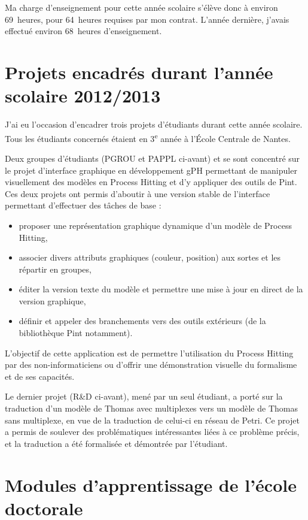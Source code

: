 Ma charge d'enseignement pour cette année scolaire s'élève donc à environ 69~heures, pour 64~heures requises par mon contrat.
L'année dernière, j'avais effectué environ 68~heures d'enseignement.



\section{Projets encadrés durant l'année scolaire 2012/2013}

J'ai eu l'occasion d'encadrer trois projets d'étudiants durant cette année scolaire. Tous les étudiants concernés étaient en 3\textsuperscript{e} année à l'École Centrale de Nantes.

Deux groupes d'étudiants (PGROU et PAPPL ci-avant) et se sont concentré sur le projet d'interface graphique en développement gPH permettant de manipuler visuellement des modèles en Process Hitting et d'y appliquer des outils de Pint.
Ces deux projets ont permis d'aboutir à une version stable de l'interface permettant d'effectuer des tâches de base :
\begin{itemize}
  \item proposer une représentation graphique dynamique d'un modèle de Process Hitting,
  \item associer divers attributs graphiques (couleur, position) aux sortes et les répartir en groupes,
  \item éditer la version texte du modèle et permettre une mise à jour en direct de la version graphique,
  \item définir et appeler des branchements vers des outils extérieurs (de la bibliothèque Pint notamment).
\end{itemize}
L'objectif de cette application est de permettre l'utilisation du Process Hitting par des non-informaticiens ou d'offrir une démonstration visuelle du formalisme et de ses capacités.

Le dernier projet (R\&D ci-avant), mené par un seul étudiant, a porté sur la traduction d'un modèle de Thomas avec multiplexes vers un modèle de Thomas sans multiplexe, en vue de la traduction de celui-ci en réseau de Petri.
Ce projet a permis de soulever des problématiques intéressantes liées à ce problème précis, et la traduction a été formalisée et démontrée par l'étudiant.



\section{Modules d'apprentissage de l'école doctorale}

